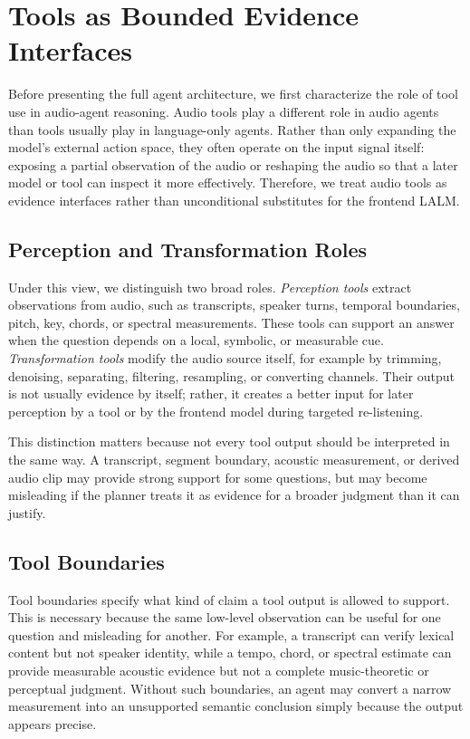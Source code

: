 \documentclass[11pt]{article}
\begin{document}
\section{Tools as Bounded Evidence Interfaces}
\label{sec:audio_tools}

Before presenting the full agent architecture, we first characterize the role of tool use in audio-agent reasoning. Audio tools play a different role in audio agents than tools usually play in language-only agents. Rather than only expanding the model's external action space, they often operate on the input signal itself: exposing a partial observation of the audio or reshaping the audio so that a later model or tool can inspect it more effectively. Therefore, we treat audio tools as evidence interfaces rather than unconditional substitutes for the frontend LALM.


\subsection{Perception and Transformation Roles}
\label{sec:audio_tools_as_evidence}

Under this view, we distinguish two broad roles. \emph{Perception tools} extract observations from audio, such as transcripts, speaker turns, temporal boundaries, pitch, key, chords, or spectral measurements. These tools can support an answer when the question depends on a local, symbolic, or measurable cue. \emph{Transformation tools} modify the audio source itself, for example by trimming, denoising, separating, filtering, resampling, or converting channels. Their output is not usually evidence by itself; rather, it creates a better input for later perception by a tool or by the frontend model during targeted re-listening.

This distinction matters because not every tool output should be interpreted in the same way. A transcript, segment boundary, acoustic measurement, or derived audio clip may provide strong support for some questions, but may become misleading if the planner treats it as evidence for a broader judgment than it can justify.

\subsection{Tool Boundaries}
\label{sec:tool_boundaries}

Tool boundaries specify what kind of claim a tool output is allowed to support. This is necessary because the same low-level observation can be useful for one question and misleading for another. For example, a transcript can verify lexical content but not speaker identity, while a tempo, chord, or spectral estimate can provide measurable acoustic evidence but not a complete music-theoretic or perceptual judgment. Without such boundaries, an agent may convert a narrow measurement into an unsupported semantic conclusion simply because the output appears precise.
\end{document}
